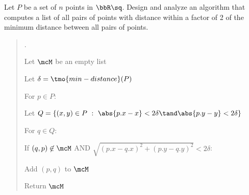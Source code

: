\documentclass[10pt]{article}
\begin{document}
\setcounter{section}{3}
\setcounter{exercise}{2}
\begin{exercise} %
  Let $ P $ be a set of $ n $ points in $ \bbR\sq $. Design and analyze an algorithm that computes a
  list of all pairs of points with distance within a factor of 2 of the minimum distance between all
  pairs of points.
\end{exercise}

\begin{quote}
.
\begin{steps}
  \item Let $ \mcM $ be an empty list
  \item Let $ \delta = \tmo{min-distance}(P) $
  \item For $ p \in P $: 
  \begin{steps}
    \item Let $ Q = \{(x,y)\in P\ :\ \abs{p.x-x} < 2\delta \tand \abs{p.y-y} < 2\delta\} $
    \item For $ q \in Q $: 
    \begin{steps}
      \item If $ (q,p) \not\in \mcM $ AND $ \sqrt{(p.x-q.x)^2 + (p.y-q.y)^2} < 2\delta $:
      \begin{steps}
        \item Add $ (p,q) $ to $ \mcM $
      \end{steps}
    \end{steps}
  \end{steps}
  \item Return $ \mcM $
\end{steps}
\end{quote}
\end{document}

